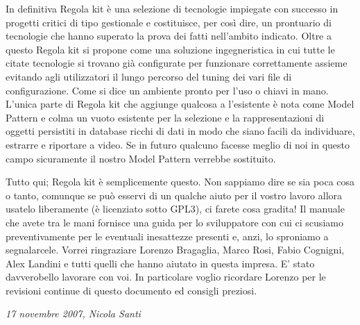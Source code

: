 In definitiva Regola kit è una selezione di tecnologie impiegate con successo in progetti critici di tipo gestionale e costituisce, per così dire, un prontuario di tecnologie che hanno superato la prova dei fatti nell'ambito indicato. Oltre a questo Regola kit si propone come una soluzione ingegneristica in cui tutte le citate tecnologie si trovano già configurate per funzionare correttamente assieme evitando agli utilizzatori il lungo percorso del tuning dei vari file di configurazione. Come si dice un ambiente pronto per l'uso o chiavi in mano.
L'unica parte di Regola kit che aggiunge qualcosa a l'esistente è nota come Model Pattern e colma un vuoto esistente per la selezione e la rappresentazioni di oggetti persistiti in database ricchi di dati in modo che siano facili da individuare, estrarre e riportare a video. Se in futuro qualcuno facesse meglio di noi in questo campo sicuramente il nostro Model Pattern verrebbe sostituito.

Tutto qui; Regola kit è semplicemente questo. Non sappiamo dire se sia poca cosa o tanto, comunque se può esservi di un qualche aiuto per il vostro lavoro allora usatelo liberamente (è licenziato sotto GPL3), ci farete cosa gradita!  Il manuale che avete tra le mani  fornisce una guida per lo sviluppatore con cui ci scusiamo preventivamente per le eventuali inesattezze presenti e, anzi, lo sproniamo a segnalarcele. Vorrei ringraziare Lorenzo Bragaglia, Marco Rosi, Fabio Cognigni, Alex Landini e  tutti quelli che hanno aiutato in questa impresa. E' stato davverobello lavorare con voi. In particolare voglio ricordare Lorenzo per le revisioni continue di questo documento ed  consigli preziosi.

\begin{flushright}
\textit{17 novembre 2007, Nicola Santi}
\end{flushright}



